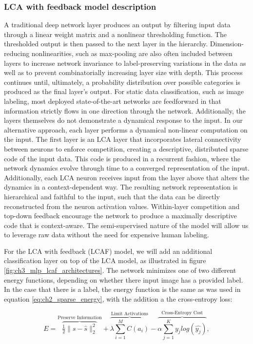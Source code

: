\subsubsection{LCA with feedback model description}
A traditional deep network layer produces an output by filtering input data through a linear weight matrix and a nonlinear thresholding function. The thresholded output is then passed to the next layer in the hierarchy. Dimension-reducing nonlinearities, such as max-pooling are also often included between layers to increase network invariance to label-preserving variations in the data as well as to prevent combinatorially increasing layer size with depth. This process continues until, ultimately, a probability distribution over possible categories is produced as the final layer’s output. For static data classification, such as image labeling, most deployed state-of-the-art networks are feedforward in that information strictly flows in one direction through the network. Additionally, the layers themselves do not demonstrate a dynamical response to the input. In our alternative approach, each layer performs a dynamical non-linear computation on the input. The first layer is an LCA layer that incorporates lateral connectivity between neurons to enforce competition, creating a descriptive, distributed sparse code of the input data. This code is produced in a recurrent fashion, where the network dynamics evolve through time to a converged representation of the input. Additionally, each LCA neuron receives input from the layer above that alters the dynamics in a context-dependent way. The resulting network representation is hierarchical and faithful to the input, such that the data can be directly reconstructed from the neuron activation values. Within-layer competition and top-down feedback encourage the network to produce a maximally descriptive code that is context-aware. The semi-supervised nature of the model will allow us to leverage raw data without the need for expensive human labeling.

For the LCA with feedback (LCAF) model, we will add an additional classification layer on top of the LCA model, as illustrated in figure \ref{fig:ch3_mlp_lcaf_architectures}.  The network minimizes one of two different energy functions, depending on whether there input image has a provided label. In the case that there is a label, the energy function is the same as was used in equation \ref{eq:ch2_sparse_energy}, with the addition a the cross-entropy loss:

\begin{equation}\label{eq:ch3_lcaf_supervised_energy}
         E =
        \overbrace{ \tfrac{1}{2} \| s - \hat{s} \|_{2}^{2} }^\text{Preserve Information} +
        \overbrace{ \lambda \sum\limits_{i=1}^{M}C(a_{i}) }^\text{Limit Activations} -
        \overbrace{ \alpha \sum\limits_{j=1}^{K} y_{j}log(\hat{y_{j}})}^\text{Cross-Entropy Cost},
\end{equation}

